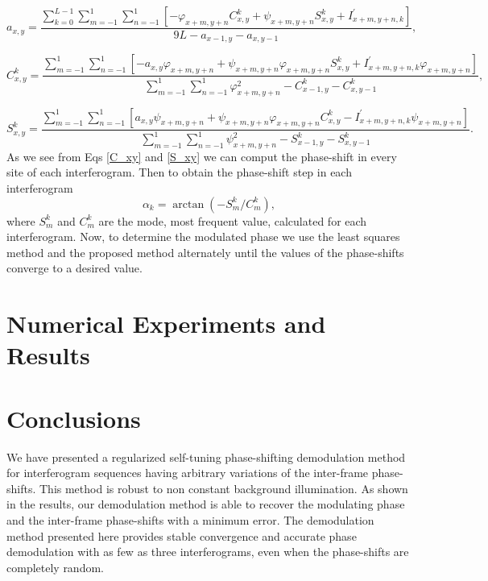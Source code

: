 \documentclass[letterpaper,12pt]{article}   %
\begin{document}
\begin{equation}
a_{x,y} = \frac{ \sum_{k=0}^{L-1} \sum_{m=-1}^{1} \sum_{n=-1}^{1} \left[ -\varphi_{x+m,y+n}C_{x,y}^k+\psi_{x+m,y+n}S_{x,y}^k+I_{x+m,y+n,k}^{'} \right] } { 9L - a_{x-1,y}-a_{x,y-1}},
\end{equation}

\begin{equation}\label{C_xy}
C_{x,y}^k = \frac{ \sum_{m=-1}^{1} \sum_{n=-1}^{1} \left[ -a_{x,y} \varphi_{x+m,y+n}+ \psi_{x+m,y+n} \varphi_{x+m,y+n} S_{x,y}^k + I_{x+m,y+n,k}^{'} \varphi_{x+m,y+n} \right] } { \sum_{m=-1}^{1} \sum_{n=-1}^{1} \varphi_{x+m,y+n}^2 -C_{x-1,y}^k-C_{x,y-1}^k },
\end{equation}

\begin{equation}\label{S_xy}
S_{x,y}^k = \frac{ \sum_{m=-1}^{1} \sum_{n=-1}^{1} \left[ a_{x,y} \psi_{x+m,y+n} + \psi_{x+m,y+n} \varphi_{x+m,y+n} C_{x,y}^k - I_{x+m,y+n,k}^{'} \psi_{x+m,y+n} \right] } { \sum_{m=-1}^{1} \sum_{n=-1}^{1} \psi_{x+m,y+n}^2 - S_{x-1,y}^k - S_{x,y-1}^k }.
\end{equation}
As we see from Eqs \ref{C_xy} and \ref{S_xy} we can comput the phase-shift in every site of each interferogram. Then to obtain the phase-shift step in each interferogram
\begin{equation}
\alpha_k = \arctan(-S_m^k/C_m^k),
\end{equation}
where $S_m^k$ and $C_m^k$ are the mode, most frequent value, calculated for each interferogram.
Now, to determine the modulated phase we use the least squares method and the proposed method alternately until the values ​​of the phase-shifts converge to a desired value.

\section{Numerical Experiments and Results}

\section{Conclusions}
We have presented a regularized self-tuning phase-shifting demodulation method for interferogram sequences having arbitrary variations of the inter-frame phase-shifts. This method is robust to non constant background illumination. As shown in the results, our demodulation method is able to recover the modulating phase and the inter-frame phase-shifts with a minimum error. The demodulation method presented here provides stable convergence and accurate phase demodulation with as few as three interferograms, even when the phase-shifts are completely random.




\end{document}
